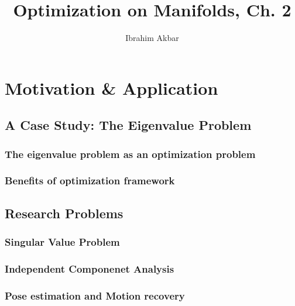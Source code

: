 \documentclass[a4paper]{article}
\begin{document}
\title{Optimization on Manifolds, Ch. 2}
\author{Ibrahim Akbar}
\maketitle

\section{Motivation \& Application}

\subsection{A Case Study: The Eigenvalue Problem}

\subsubsection{The eigenvalue problem as an optimization problem}

\subsubsection{Benefits of optimization framework}

\subsection{Research Problems}

\subsubsection{Singular Value Problem}

\subsubsection{Independent Componenet Analysis}

\subsubsection{Pose estimation and Motion recovery}
\end{document}
